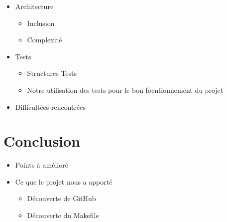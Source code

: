 \documentclass{article}
\begin{document}
\begin{itemize}
    
    \item Architecture 
    \begin{itemize}
        \item Inclusion
        \item Complexité 
    \end{itemize}
    \item Tests 
    \begin{itemize}
        \item Structures Tests
        \item Notre utilisation des tests pour le bon focntionnement du projet 
    \end{itemize}
    \item Difficultées rencontrées 
    \end{itemize}

\section{Conclusion}
\begin{itemize}
    \item Points à amélioré

    \item Ce que le projet nous a apporté 
    \begin{itemize}
        \item Découverte de GitHub
        \item Découverte du Makefile
    \end{itemize}
\end{itemize}
\end{document}
